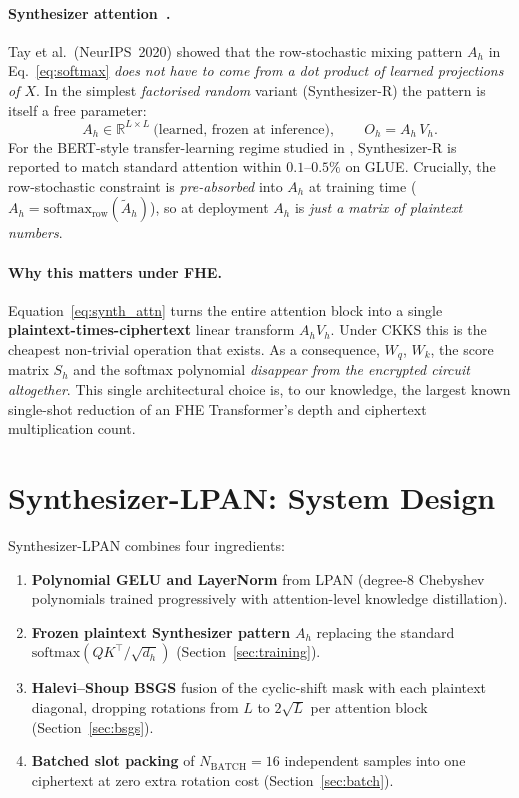 \documentclass[11pt,a4paper]{article}
\newcommand{\softmax}{\mathrm{softmax}}
\newcommand{\Bbatch}{N_{\mathrm{BATCH}}}
\begin{document}
\paragraph{Synthesizer attention~\cite{tay2020synthesizer}.}
Tay et al.\ (NeurIPS~2020) showed that the row-stochastic mixing
pattern $A_h$ in Eq.~\eqref{eq:softmax} \emph{does not have to come
from a dot product of learned projections of $X$}.  In the simplest
\emph{factorised random} variant (Synthesizer-R) the pattern is itself
a free parameter:
\begin{equation}
A_h \in \mathbb{R}^{L\times L}\ \text{(learned, frozen at inference)},
\qquad O_h = A_h\, V_h.
\label{eq:synth_attn}
\end{equation}
For the BERT-style transfer-learning regime studied in
\cite{tay2020synthesizer}, Synthesizer-R is reported to match standard
attention within $0.1$--$0.5\%$ on GLUE.  Crucially, the row-stochastic
constraint is \emph{pre-absorbed} into $A_h$ at training time
($A_h = \softmax_{\text{row}}(\tilde A_h)$), so at deployment $A_h$ is
\emph{just a matrix of plaintext numbers}.

\paragraph{Why this matters under FHE.}  Equation~\eqref{eq:synth_attn}
turns the entire attention block into a single
\textbf{plaintext-times-ciphertext} linear transform $A_h V_h$.  Under
CKKS this is the cheapest non-trivial operation that exists.  As a
consequence, $W_q$, $W_k$, the score matrix $S_h$ and the softmax
polynomial \emph{disappear from the encrypted circuit altogether}.  This
single architectural choice is, to our knowledge, the largest known
single-shot reduction of an FHE Transformer's depth and ciphertext
multiplication count.

\section{Synthesizer-LPAN: System Design}

Synthesizer-LPAN combines four ingredients:
\begin{enumerate}[leftmargin=2em]
  \item \textbf{Polynomial GELU and LayerNorm} from LPAN
        (degree-8 Chebyshev polynomials trained progressively with
        attention-level knowledge distillation).
  \item \textbf{Frozen plaintext Synthesizer pattern} $A_h$
        replacing the standard $\softmax(QK^\top/\sqrt{d_h})$
        (Section~\ref{sec:training}).
  \item \textbf{Halevi--Shoup BSGS} fusion of the cyclic-shift mask
        with each plaintext diagonal, dropping rotations from $L$
        to $2\sqrt{L}$ per attention block (Section~\ref{sec:bsgs}).
  \item \textbf{Batched slot packing} of $\Bbatch=16$ independent
        samples into one ciphertext at zero extra rotation cost
        (Section~\ref{sec:batch}).
\end{enumerate}
\end{document}
